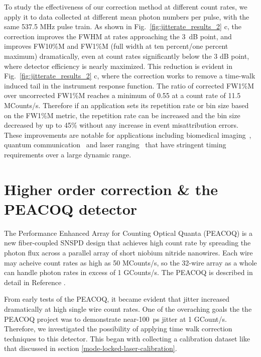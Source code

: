 \documentclass[11pt]{caltech_thesis} %
\begin{document}
To study the effectiveness of our correction method at different count rates, we apply it to data collected at different mean photon numbers per pulse, with the same 537.5 MHz pulse train. As shown in Fig.~\ref{fig:jitterate_results_2} c, the correction improves the FWHM at rates approaching the 3~dB point, and improves FW10\%M and FW1\%M (full width at ten percent/one percent maximum) dramatically, even at count rates significantly below the 3 dB point, where detector efficiency is nearly maximized. This reduction is evident in Fig.~\ref{fig:jitterate_results_2} c, where the correction works to remove a time-walk induced tail in the instrument response function. The ratio of corrected FW1\%M over uncorrected FW1\%M reaches a minimum of 0.55 at a count rate of 11.5 MCounts/s. Therefore if an application sets its repetition rate or bin size based on the FW1\%M metric, the repetition rate can be increased and the bin size decreased by up to 45\% without any increase in event misattribution errors. These improvements are notable for applications including biomedical imaging~\autocite{Sutin16,Bruschini2019}, quantum communication~\autocite{Hadfield2009} and laser ranging~\autocite{McCarthy13} that have stringent timing requirements over a large dynamic range.

\hypertarget{higher-order-correction-the-peacoq-detector}{%
\section{Higher order correction \& the PEACOQ detector}\label{higher-order-correction-the-peacoq-detector}}

The Performance Enhanced Array for Counting Optical Quanta (PEACOQ) is a new fiber-coupled SNSPD design that achieves high count rate by spreading the photon flux across a parallel array of short niobium nitride nanowires. Each wire may acheive count rates as high as 50 MCounts/s, so the 32-wire array as a whole can handle photon rates in excess of 1 GCounts/s. The PEACOQ is described in detail in Reference \autocite{Craiciu23}.

From early tests of the PEACOQ, it became evident that jitter increased dramatically at high single wire count rates. One of the overaching goals the the PEACOQ project was to demonstrate near-100~ps jitter at 1 GCount/s. Therefore, we investigated the possibility of applying time walk correction techniques to this detector. This began with collecting a calibration dataset like that discussed in section \ref{mode-locked-laser-calibration}.
\end{document}
